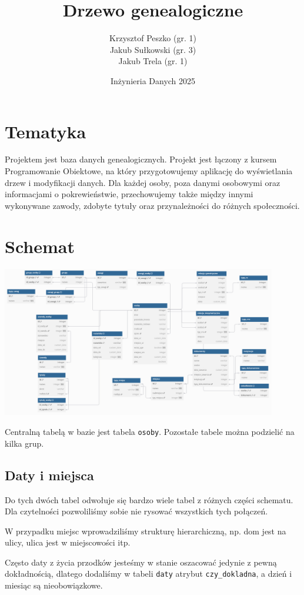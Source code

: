 \documentclass{article}
\title{Drzewo genealogiczne}
\author{Krzysztof Peszko (gr. 1) \\
Jakub Sułkowski (gr. 3) \\ Jakub Trela (gr. 1)}
\date{Inżynieria Danych 2025}
\begin{document}
\maketitle

\section{Tematyka}
Projektem jest baza danych genealogicznych. Projekt jest łączony z kursem Programowanie Obiektowe, na który przygotowujemy aplikację do wyświetlania drzew i modyfikacji danych. Dla każdej osoby, poza danymi osobowymi oraz informacjami o pokrewieństwie, przechowujemy także między innymi wykonywane zawody, zdobyte tytuły oraz przynależności do różnych społeczności.

\section{Schemat}
\begin{center}
    \includegraphics[width=0.9\textwidth]{img/Database_plan_final.png}
\end{center}
Centralną tabelą w bazie jest tabela \texttt{osoby}. Pozostałe tabele można podzielić na kilka grup.

\subsection{Daty i miejsca}
Do tych dwóch tabel odwołuje się bardzo wiele tabel z różnych części schematu. Dla czytelności pozwoliliśmy sobie nie rysować wszystkich tych połączeń.

W przypadku miejsc wprowadziliśmy strukturę hierarchiczną, np. dom jest na ulicy, ulica jest w miejscowości itp.

Często daty z życia przodków jesteśmy w stanie oszacować jedynie z pewną dokładnością, dlatego dodaliśmy w tabeli \texttt{daty} atrybut \texttt{czy\_dokladna}, a dzień i miesiąc są nieobowiązkowe.
\end{document}

